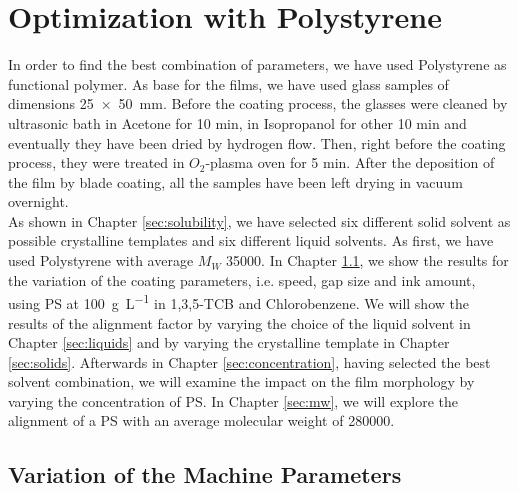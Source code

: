 \documentclass  [
  paper    = a4,
  BCOR     = 10mm,
  twoside,
  fontsize = 12pt,
  fleqn,
  toc      = bibnumbered,
  toc      = listofnumbered,
  numbers  = noendperiod,
  headings = normal,
  listof   = leveldown,
  version  = 3.03
]                                       {scrreprt}
\begin{document}
	\section{Optimization with Polystyrene}
	In order to find the best combination of parameters, we have used Polystyrene as functional polymer. As base for the films, we have used glass samples of dimensions \SI{25x50}{\milli\metre}. Before the coating process, the glasses were cleaned by ultrasonic bath in Acetone for 10 min, in Isopropanol for other 10 min and eventually they have been dried by hydrogen flow. Then, right before the coating process, they were treated in $O_2$-plasma oven for 5 min. After the deposition of the film by blade coating, all the samples have been left drying in vacuum overnight.\\
As shown in Chapter \ref{sec:solubility}, we have selected six different solid solvent as possible crystalline templates and six different liquid solvents. As first, we have used Polystyrene with average $M_W$ \num{35000}. In Chapter \ref{sec:machine}, we show the results for the variation of the coating parameters, i.e. speed, gap size and ink amount, using PS at \SI{100}{\gram\per\liter} in 1,3,5-TCB and Chlorobenzene. We will show the results of the alignment factor by varying the choice of the liquid solvent in Chapter \ref{sec:liquids} and by varying the crystalline template in Chapter \ref{sec:solids}. Afterwards in Chapter \ref{sec:concentration}, having selected the best solvent combination, we will examine the impact on the film morphology by varying the concentration of PS. In Chapter \ref{sec:mw}, we will explore the alignment of a PS with an average molecular weight of \num{280000}.\\
		
		\subsection{Variation of the Machine Parameters}\label{sec:machine}
		
\end{document}
